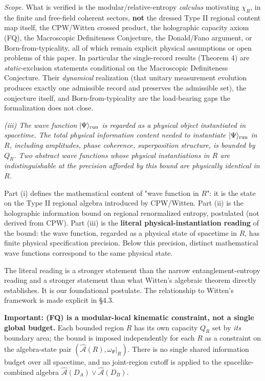 \documentclass[11pt,a4paper]{article}
\begin{document}
\emph{Scope.} What is verified is the modular/relative-entropy \emph{calculus} motivating $\chi_R$, in the finite and free-field coherent sectors, \textbf{not} the dressed Type II regional content map itself, the CPW/Witten crossed product, the holographic capacity axiom (FQ), the Macroscopic Definiteness Conjecture, the Donald/Fano argument, or Born-from-typicality, all of which remain explicit physical assumptions or open problems of this paper. In particular the single-record results (Theorem 4) are \emph{static}-exclusion statements conditional on the Macroscopic Definiteness Conjecture. Their \emph{dynamical} realization (that unitary measurement evolution produces exactly one admissible record and preserves the admissible set), the conjecture itself, and Born-from-typicality are the load-bearing gaps the formalization does not close.

\emph{(iii) The wave function $|\Psi\rangle_{\rm run}$ is regarded as a physical object instantiated in spacetime. The total physical information content needed to instantiate $|\Psi\rangle_{\rm run}$ in $R$, including amplitudes, phase coherence, superposition structure, is bounded by $Q_R$. Two abstract wave functions whose physical instantiations in $R$ are indistinguishable at the precision afforded by this bound are physically identical in $R$.}

Part (i) defines the mathematical content of "wave function in $R$": it is the state on the Type II regional algebra introduced by CPW/Witten. Part (ii) is the holographic information bound on regional renormalized entropy, postulated (not derived from CPW). Part (iii) is the \textbf{literal physical-instantiation reading} of the bound: the wave function, regarded as a physical state of spacetime in $R$, has finite physical specification precision. Below this precision, distinct mathematical wave functions correspond to the same physical state.

The literal reading is a stronger statement than the narrow entanglement-entropy reading and a stronger statement than what Witten's algebraic theorem directly establishes. It is our foundational postulate. The relationship to Witten's framework is made explicit in §4.3.

\textbf{Important: (FQ) is a modular-local kinematic constraint, not a single global budget.} Each bounded region $R$ has its own capacity $Q_R$ set by \emph{its} boundary area; the bound is imposed independently for each $R$ as a constraint on the algebra-state pair $(\hat{\mathcal{A}}(R), \omega_\Psi|_R)$. There is no single shared information budget over all spacetime, and no joint-region cutoff is applied to the spacelike-combined algebra $\hat{\mathcal{A}}(D_A) \vee \hat{\mathcal{A}}(D_B)$.
\end{document}
